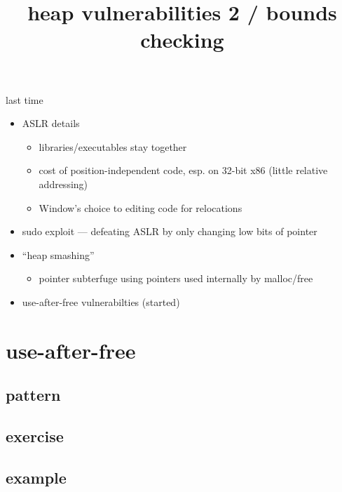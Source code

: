 \graphicspath{{./figures/}}
\title{heap vulnerabilities 2 / bounds checking}
\date{}

\begin{frame}
    \titlepage
\end{frame}

\begin{frame}{last time}
    \begin{itemize}
    \item ASLR details
        \begin{itemize}
        \item libraries/executables stay together
        \item cost of position-independent code, esp. on 32-bit x86 (little relative addressing)
        \item Window's choice to editing code for relocations
        \end{itemize}
    \item sudo exploit --- defeating ASLR by only changing low bits of pointer
    \item ``heap smashing''
        \begin{itemize}
        \item pointer subterfuge using pointers used internally by malloc/free
        \end{itemize}
    \item use-after-free vulnerabilties (started)
    \end{itemize}
\end{frame}

\section{use-after-free}


\subsection{pattern}


\subsection{exercise}


\subsection{example}


